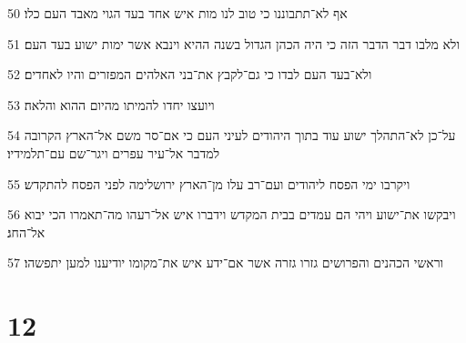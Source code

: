 \par 50 אף לא־תתבוננו כי טוב לנו מות איש אחד בעד הגוי מאבד העם כלו׃
\par 51 ולא מלבו דבר הדבר הזה כי היה הכהן הגדול בשנה ההיא וינבא אשר ימות ישוע בעד העם׃
\par 52 ולא־בעד העם לבדו כי גם־לקבץ את־בני האלהים המפזרים והיו לאחדים׃
\par 53 ויועצו יחדו להמיתו מהיום ההוא והלאה׃
\par 54 על־כן לא־התהלך ישוע עוד בתוך היהודים לעיני העם כי אם־סר משם אל־הארץ הקרובה למדבר אל־עיר עפרים ויגר־שם עם־תלמידיו׃
\par 55 ויקרבו ימי הפסח ליהודים ועם־רב עלו מן־הארץ ירושלימה לפני הפסח להתקדש׃
\par 56 ויבקשו את־ישוע ויהי הם עמדים בבית המקדש וידברו איש אל־רעהו מה־תאמרו הכי יבוא אל־החג׃
\par 57 וראשי הכהנים והפרושים גזרו גזרה אשר אם־ידע איש את־מקומו יודיענו למען יתפשהו׃

\chapter{12}

